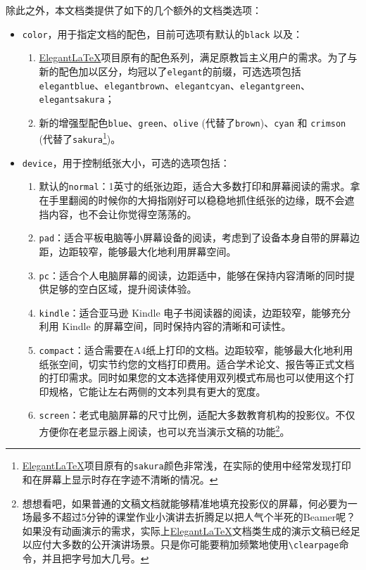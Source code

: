 除此之外，本文档类提供了如下的几个额外的文档类选项：

\begin{itemize}
    \item \texttt{color}，用于指定文档的配色，目前可选项有默认的\texttt{black} 以及：
    \begin{enumerate}
        \item \href{https://github.com/ElegantLaTeX/}{Elegant\LaTeX}项目原有的配色系列，满足原教旨主义用户的需求。为了与新的配色加以区分，均冠以了\texttt{elegant}的前缀，可选选项包括\texttt{elegantblue}、\texttt{elegantbrown}、\texttt{elegantcyan}、\texttt{elegantgreen}、\texttt{elegantsakura}；
        \item 新的增强型配色\texttt{blue}、\texttt{green}、\texttt{olive} (代替了\texttt{brown})、\texttt{cyan} 和 \texttt{crimson} (代替了\texttt{sakura}\footnote{\href{https://github.com/ElegantLaTeX/}{Elegant\LaTeX}项目原有的\texttt{sakura}颜色非常浅，在实际的使用中经常发现打印和在屏幕上显示时存在字迹不清晰的情况。})。
    \end{enumerate}
    \item \texttt{device}，用于控制纸张大小，可选的选项包括：
    \begin{enumerate}
        \item 默认的\texttt{normal}：1英寸的纸张边距，适合大多数打印和屏幕阅读的需求。拿在手里翻阅的时候你的大拇指刚好可以稳稳地抓住纸张的边缘，既不会遮挡内容，也不会让你觉得空荡荡的。
        \item \texttt{pad}：适合平板电脑等小屏幕设备的阅读，考虑到了设备本身自带的屏幕边距，边距较窄，能够最大化地利用屏幕空间。
        \item \texttt{pc}：适合个人电脑屏幕的阅读，边距适中，能够在保持内容清晰的同时提供足够的空白区域，提升阅读体验。
        \item \texttt{kindle}：适合亚马逊 Kindle 电子书阅读器的阅读，边距较窄，能够充分利用 Kindle 的屏幕空间，同时保持内容的清晰和可读性。
        \item \texttt{compact}：适合需要在A4纸上打印的文档。边距较窄，能够最大化地利用纸张空间，切实节约您的文档打印费用。适合学术论文、报告等正式文档的打印需求。同时如果您的文本选择使用双列模式布局也可以使用这个打印规格，它能让左右两侧的文本列具有更大的宽度。
        \item \texttt{screen}：老式电脑屏幕的尺寸比例，适配大多数教育机构的投影仪。不仅方便你在老显示器上阅读，也可以充当演示文稿的功能\footnote{想想看吧，如果普通的文稿文档就能够精准地填充投影仪的屏幕，何必要为一场最多不超过5分钟的课堂作业小演讲去折腾足以把人气个半死的Beamer呢？如果没有动画演示的需求，实际上\href{https://github.com/ElegantLaTeX/}{Elegant\LaTeX}文档类生成的演示文稿已经足以应付大多数的公开演讲场景。只是你可能要稍加频繁地使用\texttt{\textbackslash clearpage}命令，并且把字号加大几号。}。

\end{enumerate}
\end{itemize}
